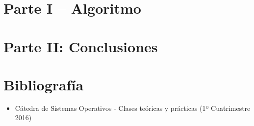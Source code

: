 \documentclass[a4paper,10pt,twoside]{article}
\begin{document}
\newpage




\tableofcontents

\newpage



\newpage
\section{Parte I – Algoritmo}


\newpage

\section{Parte II: Conclusiones}


\newpage



\newpage
\section{Bibliografía}

\begin{itemize}
 \item Cátedra de Sistemas Operativos - Clases teóricas y prácticas (1º Cuatrimestre 2016)
\end{itemize}
\end{document}
